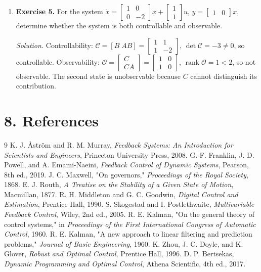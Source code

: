 \begin{enumerate}[leftmargin=*,itemsep=0.9em]
\item \textbf{Exercise 5.} For the system $\dot x=\begin{bmatrix}1&0\\0&-2\end{bmatrix}x+\begin{bmatrix}1\\1\end{bmatrix}u$, $y=\begin{bmatrix}1&0\end{bmatrix}x$, determine whether the system is both controllable and observable.

\emph{Solution.} Controllability: $\mathcal C=[B\;AB]=\begin{bmatrix}1&1\\1&-2\end{bmatrix}$, $\det\mathcal C=-3\neq0$, so controllable. Observability: $\mathcal O=\begin{bmatrix}C\\CA\end{bmatrix}=\begin{bmatrix}1&0\\1&0\end{bmatrix}$, $\operatorname{rank}\mathcal O=1<2$, so not observable. The second state is unobservable because $C$ cannot distinguish its contribution.

\end{enumerate}
\section*{8. References}


\begin{thebibliography}{9}
 K. J. Åström and R. M. Murray, \emph{Feedback Systems: An Introduction for Scientists and Engineers}, Princeton University Press, 2008.
 G. F. Franklin, J. D. Powell, and A. Emami-Naeini, \emph{Feedback Control of Dynamic Systems}, Pearson, 8th ed., 2019.
 J. C. Maxwell, "On governors," \emph{Proceedings of the Royal Society}, 1868.
 E. J. Routh, \emph{A Treatise on the Stability of a Given State of Motion}, Macmillan, 1877.
 R. H. Middleton and G. C. Goodwin, \emph{Digital Control and Estimation}, Prentice Hall, 1990.
 S. Skogestad and I. Postlethwaite, \emph{Multivariable Feedback Control}, Wiley, 2nd ed., 2005.
 R. E. Kalman, "On the general theory of control systems," in \emph{Proceedings of the First International Congress of Automatic Control}, 1960.
 R. E. Kalman, "A new approach to linear filtering and prediction problems," \emph{Journal of Basic Engineering}, 1960.
 K. Zhou, J. C. Doyle, and K. Glover, \emph{Robust and Optimal Control}, Prentice Hall, 1996.
 D. P. Bertsekas, \emph{Dynamic Programming and Optimal Control}, Athena Scientific, 4th ed., 2017.
\end{thebibliography}
